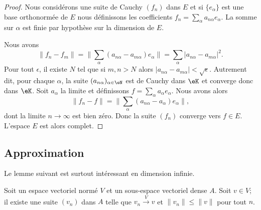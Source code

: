\begin{proof}
    Nous considérons une suite de Cauchy \( (f_n)\) dans \( E\) et si \( \{ e_{\alpha} \} \) est une base orthonormée de \( E\) nous définissons les coefficients \( f_n=\sum_{\alpha}a_{n\alpha}e_{\alpha} \). La somme sur \( \alpha\) est finie par hypothèse sur la dimension de \( E\).

    Nous avons
    \begin{equation}
        \| f_n-f_m \|=\| \sum_{\alpha}(a_{n\alpha}-a_{m\alpha})e_{\alpha} \|=\sum_{\alpha}| a_{n\alpha}-a_{m\alpha} |^2.
    \end{equation}
    Pour tout \( \epsilon\), il existe \( N\) tel que si \( m,n>N\) alors \( | a_{n\alpha}-a_{m\alpha} |<\sqrt{ \epsilon }\). Autrement dit, pour chaque \( \alpha\), la suite \( (a_{n\alpha})_{\alpha\in \eN}\) est de Cauchy dans \( \eK\) et converge donc dans \( \eK\). Soit \( a_{\alpha}\) la limite et définissons \( f=\sum_{\alpha}a_{\alpha}e_{\alpha}\). Nous avons alors
    \begin{equation}
        \| f_n-f \|=\| \sum_{\alpha}(a_{n\alpha}-a_{\alpha})e_{\alpha} \|,
    \end{equation}
    dont la limite \( n\to \infty\) est bien zéro. Donc la suite \( (f_n)\) converge vers \( f\in E\). L'espace \( E\) est alors complet.
\end{proof}

\subsection{Approximation}

Le lemme suivant est surtout intéressant en dimension infinie.
\begin{lemma}
    Soit un espace vectoriel normé \( V\) et un sous-espace vectoriel dense \( A\). Soit \( v\in V\); il existe une suite \( (v_n)\) dans \( A\) telle que \( v_n\stackrel{V}{\longrightarrow}v\) et \( \| v_n \|\leq \| v \|\) pour tout \( n\).
\end{lemma}

